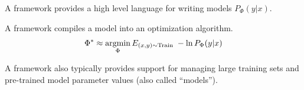 {

A framework provides a high level language for writing models $P_\Phi(y|x)$.

\vfill
A framework compiles a model into an optimization algorithm.
\vfill
{\color{red} $$\Phi^* \approx \operatorname*{argmin}_\Phi E_{(x,y) \sim \mathrm{Train}} \; -\ln P_\Phi(y|x)$$}

\vfill
A framework also typically provides support for managing large training sets and pre-trained model parameter values (also called ``models'').

 
}


